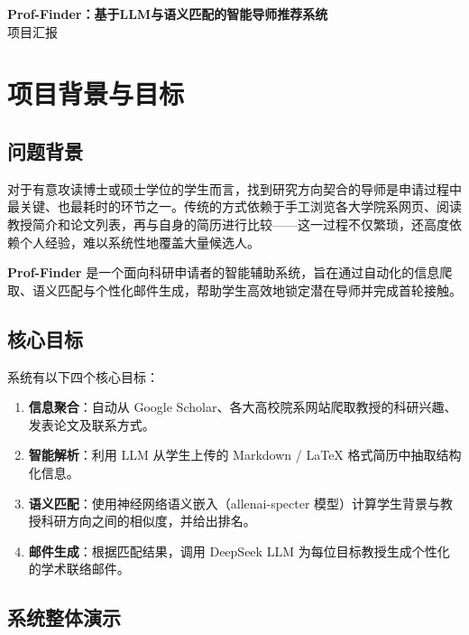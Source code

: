 \documentclass[11pt]{article}
\begin{document}
\begin{center}
{\LARGE\bfseries Prof-Finder：基于LLM与语义匹配的智能导师推荐系统} \\[6pt]
{\large 项目汇报}
\end{center}

\vspace{5mm}
\tableofcontents

\newpage
\pagestyle{plain}
\setcounter{page}{1}

\section{项目背景与目标}

\subsection{问题背景}

对于有意攻读博士或硕士学位的学生而言，找到研究方向契合的导师是申请过程中最关键、也最耗时的环节之一。传统的方式依赖于手工浏览各大学院系网页、阅读教授简介和论文列表，再与自身的简历进行比较——这一过程不仅繁琐，还高度依赖个人经验，难以系统性地覆盖大量候选人。

\textbf{Prof-Finder} 是一个面向科研申请者的智能辅助系统，旨在通过自动化的信息爬取、语义匹配与个性化邮件生成，帮助学生高效地锁定潜在导师并完成首轮接触。

\subsection{核心目标}

系统有以下四个核心目标：

\begin{enumerate}
    \item \textbf{信息聚合}：自动从 Google Scholar、各大高校院系网站爬取教授的科研兴趣、发表论文及联系方式。
    \item \textbf{智能解析}：利用 LLM 从学生上传的 Markdown / LaTeX 格式简历中抽取结构化信息。
    \item \textbf{语义匹配}：使用神经网络语义嵌入（allenai-specter 模型）计算学生背景与教授科研方向之间的相似度，并给出排名。
    \item \textbf{邮件生成}：根据匹配结果，调用 DeepSeek LLM 为每位目标教授生成个性化的学术联络邮件。
\end{enumerate}

\subsection{系统整体演示}
\end{document}
